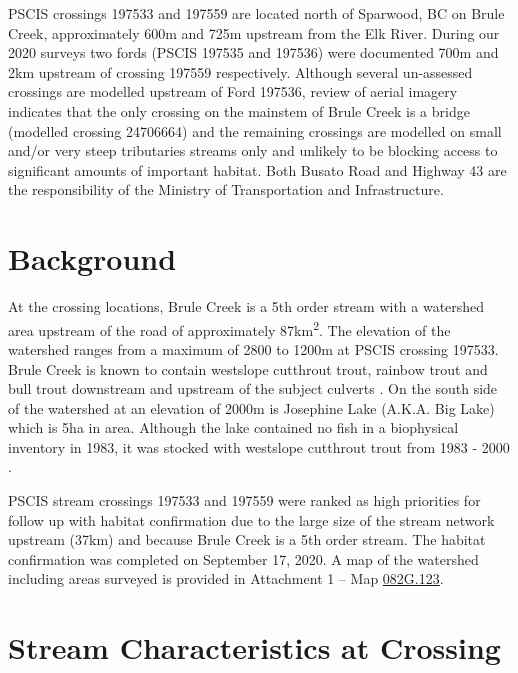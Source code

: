\documentclass[
]{book}
\begin{document}
PSCIS crossings 197533 and 197559 are located north of Sparwood, BC on Brule Creek, approximately 600m and 725m upstream from the Elk River. During our 2020 surveys two fords (PSCIS 197535 and 197536) were documented 700m and 2km upstream of crossing 197559 respectively. Although several un-assessed crossings are modelled upstream of Ford 197536, review of aerial imagery indicates that the only crossing on the mainstem of Brule Creek is a bridge (modelled crossing 24706664) and the remaining crossings are modelled on small and/or very steep tributaries streams only and unlikely to be blocking access to significant amounts of important habitat. Both Busato Road and Highway 43 are the responsibility of the Ministry of Transportation and Infrastructure.

\hypertarget{background-7}{%
\section*{Background}\label{background-7}}

At the crossing locations, Brule Creek is a 5th order stream with a watershed area upstream of the road of approximately 87km\textsuperscript{2}. The elevation of the watershed ranges from a maximum of 2800 to 1200m at PSCIS crossing 197533. Brule Creek is known to contain westslope cutthrout trout, rainbow trout and bull trout downstream and upstream of the subject culverts \citep{data_fish_obs}. On the south side of the watershed at an elevation of 2000m is Josephine Lake (A.K.A. Big Lake) which is 5ha in area. Although the lake contained no fish in a biophysical inventory in 1983, it was stocked with westslope cutthrout trout from 1983 - 2000 \citep{data_fish_obs, FishInventoriesData2020}.

PSCIS stream crossings 197533 and 197559 were ranked as high priorities for follow up with habitat confirmation due to the large size of the stream network upstream (37km) and because Brule Creek is a 5th order stream. The habitat confirmation was completed on September 17, 2020. A map of the watershed including areas surveyed is provided in Attachment 1 -- Map \href{https://hillcrestgeo.ca/outgoing/fishpassage/projects/elk/FishPassage_082G.123.pdf}{082G.123}.

\hypertarget{stream-characteristics-at-crossing-6}{%
\section*{Stream Characteristics at Crossing}\label{stream-characteristics-at-crossing-6}}
\end{document}
